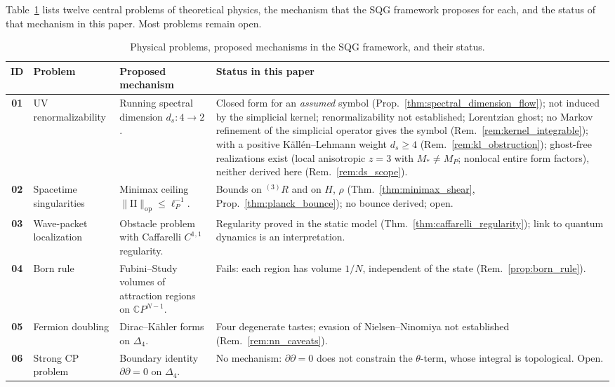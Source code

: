 \documentclass[11pt,a4paper,reqno]{amsart}
\theoremstyle{definition}
\numberwithin{equation}{section}
\newcommand{\II}{\mathrm{I\!I}}
\begin{document}
Table~\ref{tab:fundamental_problems} lists twelve central problems of theoretical physics, the mechanism that the SQG framework proposes for each, and the status of that mechanism in this paper. Most problems remain open.

\begin{table}[htbp]
\centering
\footnotesize
\renewcommand{\arraystretch}{1.25}
\caption{Physical problems, proposed mechanisms in the SQG framework, and their status.}
\label{tab:fundamental_problems}
\begin{tabularx}{\textwidth}{@{} c >{\raggedright\arraybackslash}p{2.5cm} >{\raggedright\arraybackslash}X >{\raggedright\arraybackslash}X @{}}
\toprule
\textbf{ID} & \textbf{Problem} & \textbf{Proposed mechanism} & \textbf{Status in this paper} \\
\midrule
\textbf{01} & UV renormalizability & Running spectral dimension $d_s: 4 \to 2$. & Closed form for an \emph{assumed} symbol (Prop.~\ref{thm:spectral_dimension_flow}); not induced by the simplicial kernel; renormalizability not established; Lorentzian ghost; no Markov refinement of the simplicial operator gives the symbol (Rem.~\ref{rem:kernel_integrable}); with a positive K\"all\'en--Lehmann weight $d_s \ge 4$ (Rem.~\ref{rem:kl_obstruction}); ghost-free realizations exist (local anisotropic $z=3$ with $M_\ast \ne M_P$; nonlocal entire form factors), neither derived here (Rem.~\ref{rem:ds_scope}). \\
\textbf{02} & Spacetime singularities & Minimax ceiling $\|\II\|_{\mathrm{op}} \le \ell_P^{-1}$. & Bounds on ${}^{(3)}R$ and on $H$, $\rho$ (Thm.~\ref{thm:minimax_shear}, Prop.~\ref{thm:planck_bounce}); no bounce derived; open. \\
\textbf{03} & Wave-packet localization & Obstacle problem with Caffarelli $C^{1,1}$ regularity. & Regularity proved in the static model (Thm.~\ref{thm:caffarelli_regularity}); link to quantum dynamics is an interpretation. \\
\textbf{04} & Born rule & Fubini--Study volumes of attraction regions on $\mathbb{C}P^{N-1}$. & Fails: each region has volume $1/N$, independent of the state (Rem.~\ref{prop:born_rule}). \\
\textbf{05} & Fermion doubling & Dirac--K\"ahler forms on $\Delta_4$. & Four degenerate tastes; evasion of Nielsen--Ninomiya not established (Rem.~\ref{rem:nn_caveats}). \\
\textbf{06} & Strong CP problem & Boundary identity $\partial\partial = 0$ on $\Delta_4$. & No mechanism: $\partial\partial = 0$ does not constrain the $\theta$-term, whose integral is topological. Open. \\

\end{tabularx}
\end{table}
\end{document}
